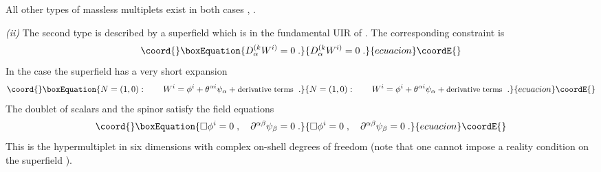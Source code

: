 \documentclass[a4paper,12pt]{article}
\begin{document}
All other types of massless multiplets exist in both cases 
\coordHE{}, \coordHE{}. 


{\sl (ii)} The second type is described by a superfield 
\coordHE{} which is in the fundamental UIR of \coordHE{}. The corresponding constraint is 
\begin{equation}\coord{}\boxEquation{\label{12}
  D^{(k}_\alpha W^{i)}=0\;.
}{D^{(k}_\alpha W^{i)}=0\;.
}{ecuacion}\coordE{}\end{equation}
In the case \coordHE{} the superfield has a very short expansion
\begin{equation}\coord{}\boxEquation{\label{13}
N=(1,0):\qquad   W^i = \phi^i + \theta^{\alpha i}\psi_\alpha + 
\mbox{\small derivative terms }\;. 
}{N=(1,0):\qquad   W^i = \phi^i + \theta^{\alpha i}\psi_\alpha + 
\mbox{\small derivative terms }\;. 
}{ecuacion}\coordE{}\end{equation}
The doublet of scalars \coordHE{} and the spinor \myHighlight{$\psi_\alpha$}\coordHE{} 
satisfy the field equations
\begin{equation}\coord{}\boxEquation{\label{14}
  \square\phi^{i} = 0\;, \quad 
\partial^{\alpha\beta}\psi_\beta = 0\;.
}{\square\phi^{i} = 0\;, \quad 
\partial^{\alpha\beta}\psi_\beta = 0\;.
}{ecuacion}\coordE{}\end{equation}
This is the \coordHE{} hypermultiplet \cite{Sohnius} in  six 
dimensions with \coordHE{} complex on-shell degrees of freedom (note 
that one cannot impose a reality condition on the superfield 
\coordHE{}). 
\end{document}
